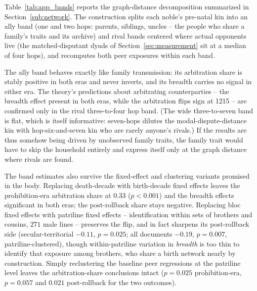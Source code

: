 \documentclass[12pt]{article}
\theoremstyle{definition}
\theoremstyle{remark}
\begin{document}
Table~\ref{tab:app_bands} reports the graph-distance decomposition summarized in Section~\ref{sub:network}. The construction splits each noble's pre-natal kin into an ally band (one and two hops: parents, siblings, uncles -- the people who share a family's traits and its archive) and rival bands centered where actual opponents live (the matched-disputant dyads of Section~\ref{sec:measurement} sit at a median of four hops), and recomputes both peer exposures within each band.

The ally band behaves exactly like family transmission: its arbitration share is stably positive in both eras and never inverts, and its breadth carries no signal in either era. The theory's predictions about arbitrating counterparties -- the breadth effect present in both eras, while the arbitration flips sign at 1215 -- are confirmed only in the rival three-to-four hop band. (The wide three-to-seven band is flat, which is itself informative: seven-hops dilutes the modal-dispute-distance kin with hop-six-and-seven kin who are rarely anyone's rivals.) If the results are thus somehow being driven by unobserved family traits, the family trait would have to skip the household entirely and express itself only at the graph distance where rivals are found.

The band estimates also survive the fixed-effect and clustering variants promised in the body. Replacing death-decade with birth-decade fixed effects leaves the prohibition-era arbitration share at $0.33$ ($p < 0.001$) and the breadth effects significant in both eras; the post-rollback share stays negative. Replacing bloc fixed effects with patriline fixed effects -- identification within sets of brothers and cousins, $271$ male lines -- preserves the flip, and in fact sharpens its post-rollback side (secular-territorial $-0.11$, $p = 0.025$; all documents $-0.19$, $p = 0.007$, patriline-clustered), though within-patriline variation in \emph{breadth} is too thin to identify that exposure among brothers, who share a birth network nearly by construction. Simply reclustering the baseline peer regressions at the patriline level leaves the arbitration-share conclusions intact ($p = 0.025$ prohibition-era, $p = 0.057$ and $0.021$ post-rollback for the two outcomes).
\end{document}
